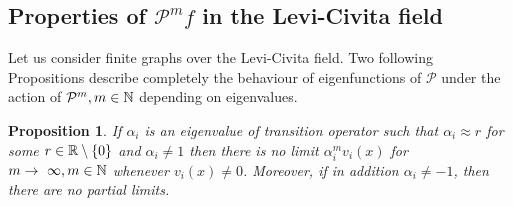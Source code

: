 \documentclass[a4paper,12pt]{amsart}
\newtheorem{proposition}{Proposition}
\theoremstyle{definition}
\renewcommand{\P}{\mathcal{P}}
\begin{document}
\subsection{Properties of $\P^m f$ in the Levi-Civita field} Let us consider finite graphs over the Levi-Civita field. Two following Propositions describe completely the behaviour of eigenfunctions of $\P$ under the action of $\P^m, m\in \Bbb N$ depending on eigenvalues.
\begin{proposition}\label{PropLC}
If $\alpha_i$ is an eigenvalue of transition operator such that $\alpha_i\approx r$ for some $r\in \Bbb R\setminus\{0\}$ and $\alpha_i\ne 1$ then there is no limit $\mathcal \alpha_{i}^m v_{i}(x)$ for $m\to~\infty, m\in\Bbb N$ whenever $v_{i}(x)\ne 0$.
Moreover, if in addition $\alpha_i\ne -1$, then there are no partial limits.
\end{proposition}
\end{document}
